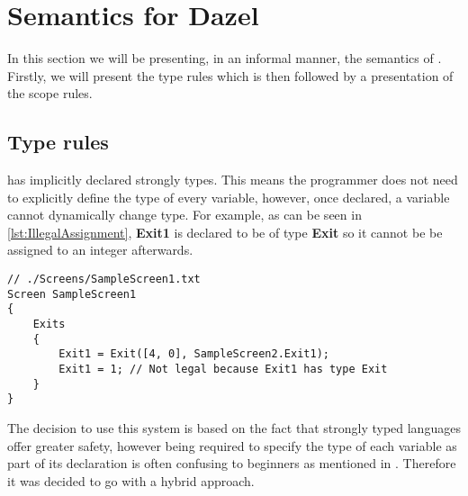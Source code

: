 \section{Semantics for Dazel}

In this section we will be presenting, in an informal manner, the semantics of \dazel.
Firstly, we will present the type rules which is then followed by a presentation of the scope rules.


\subsection*{Type rules}
\dazel has implicitly declared strongly types.
This means the programmer does not need to explicitly define the type of every variable, however, once declared, a variable
cannot dynamically change type.
For example, as can be seen in \ref{lst:IllegalAssignment}, \textbf{Exit1} is declared to be of type \textbf{Exit} so it cannot be be
assigned to an integer afterwards.

\begin{lstlisting}[caption={Example of an illegal assingment}, label={lst:IllegalAssignment},escapechar=|]
// ./Screens/SampleScreen1.txt
Screen SampleScreen1 
{
	Exits 
	{
		Exit1 = Exit([4, 0], SampleScreen2.Exit1);
		Exit1 = 1; // Not legal because Exit1 has type Exit
	}
}
\end{lstlisting}

The decision to use this system is based on the fact that strongly typed languages offer greater safety, however being required to
specify the type of each variable as part of its declaration is often confusing to beginners as mentioned in .
Therefore it was decided to go with a hybrid approach.

